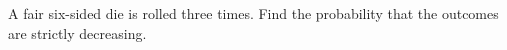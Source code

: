 A fair six-sided die is rolled three times. Find the probability that the outcomes are strictly decreasing.
